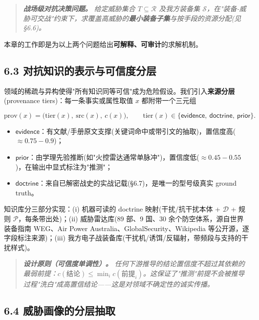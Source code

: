 \documentclass[12pt,a4paper]{ctexart}
\begin{document}
\begin{quote}\itshape \textbf{战场级对抗决策问题。} 给定威胁集合 $T\subseteq\mathcal{R}$ 及我方装备集 $\mathcal{S}$，在"装备-威胁可交战"约束下，求覆盖高威胁的\textbf{最小装备子集}与按手段的资源分配(见 §6.6)。\end{quote}

本章的工作即是为以上两个问题给出\textbf{可解释、可审计}的求解机制。


\subsection*{6.3 对抗知识的表示与可信度分层}

领域的稀疏与异构使得"所有知识同等可信"成为危险假设。我们引入\textbf{来源分层} (provenance tiers)：每一条事实或属性取值 $x$ 都附带一个三元组

\[\mathrm{prov}(x)=\big(\mathrm{tier}(x),\ \mathrm{src}(x),\ c(x)\big),\qquad \mathrm{tier}(x)\in\{\textsf{evidence},\ \textsf{doctrine},\ \textsf{prior}\}.\]

\begin{itemize}[leftmargin=2em]
\item $\textsf{evidence}$：有文献/手册原文支撑(关键词命中或带引文的抽取)，置信度高($\approx 0.75\!-\!0.9$)；
\item $\textsf{prior}$：由学理先验推断(如"火控雷达通常单脉冲")，置信度低($\approx 0.45\!-\!0.55$)，在输出中显式标注为"推测"；
\item $\textsf{doctrine}$：来自已解密战史的实战记载(§6.7)，是唯一的型号级真实 ground truth。
\end{itemize}

知识库分三部分实现：(i) 机器可读的 doctrine 映射(干扰/抗干扰本体 + $\mathcal{D}$ + 规则 $\mathcal{P}$，每条带出处)；(ii) 威胁雷达库(89 部、9 国、30 余个防空体系，源自世界装备指南 WEG、Air Power Australia、GlobalSecurity、Wikipedia 等公开源，逐字段标注来源)；(iii) 我方电子战装备库(干扰机/诱饵/反辐射，带频段与支持的干扰样式)。

\begin{quote}\itshape \textbf{设计原则（可信度单调性）。} 任何下游推导的结论置信度不超过其依赖的最弱前提：$c(\text{结论})\le \min_i c(\text{前提}_i)$。这保证了"推测"前提不会被推导过程"洗白"成高置信结论——这是对领域不确定性的诚实传播。\end{quote}


\subsection*{6.4 威胁画像的分层抽取}
\end{document}
